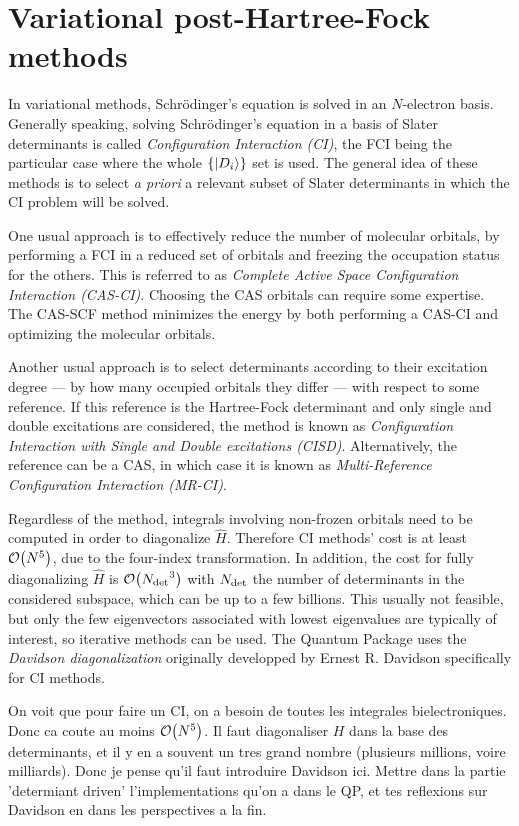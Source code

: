\documentclass[./thesis.tex]{subfiles}
\begin{document}
\section{Variational post-Hartree-Fock methods}

In variational methods, Schrödinger's equation is solved in an $N$-electron basis.
Generally speaking, solving Schrödinger's equation in a basis of Slater determinants is called \emph{Configuration Interaction (CI)}, the FCI being the particular case where the whole $\{\ket {D_i} \}$ set is used.
The general idea of these methods is to select \textit{a priori} a relevant subset of Slater determinants in which the CI problem will be solved.

One usual approach is to effectively reduce the number of molecular orbitals, by performing a FCI in a reduced set of orbitals and freezing the occupation status for the others. This is referred to as \emph{Complete Active Space Configuration Interaction (CAS-CI)}. Choosing the CAS orbitals can require some expertise. The CAS-SCF method minimizes the energy by both performing a CAS-CI and optimizing the molecular orbitals.

Another usual approach is to select determinants according to their excitation degree --- by how many occupied orbitals they differ --- with respect to some reference. If this reference is the Hartree-Fock determinant and only single and double excitations are considered, the method is known as \emph{Configuration Interaction with Single and Double excitations (CISD)}. Alternatively, the reference can be a CAS, in which case it is known as \emph{Multi-Reference Configuration Interaction (MR-CI)}.

Regardless of the method, integrals involving non-frozen orbitals need to be computed in order to diagonalize $\widehat{H}$. Therefore CI methods' cost is at least $\order{N^5}$, due to the four-index transformation.
In addition, the cost for fully diagonalizing $\widehat{H}$ is $\order{\Ndet^3}$ with ${N_\text{det}}$ the number of determinants in the considered subspace, which can be up to a few billions. This usually not feasible, but only the few eigenvectors associated with lowest eigenvalues are typically of interest, so iterative methods can be used. The Quantum Package uses the \emph{Davidson diagonalization} originally developped by Ernest R. Davidson\cite{Davidson_1975} specifically for CI methods. 

\alert{On voit que pour faire un CI, on a besoin de toutes les integrales
bielectroniques. Donc ca coute au moins $\order{N^5}$.  Il faut diagonaliser
$H$ dans la base des determinants, et il y en a souvent un tres grand nombre
(plusieurs millions, voire milliards). Donc je pense qu'il faut introduire
Davidson ici. Mettre dans la partie 'determiant driven' l'implementations qu'on
a dans le QP, et tes reflexions sur Davidson en dans les perspectives a la fin.
}
\end{document}
